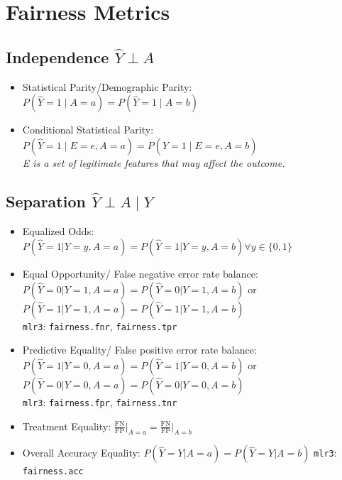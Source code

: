 \documentclass[11pt,a4paper]{article}
\begin{document}
\section{Fairness Metrics \parencite{verma2018}}

\subsection*{Independence $\hat{Y} \perp A$}
\begin{itemize}[leftmargin=2em]
    \item Statistical Parity/Demographic Parity: $P(\hat{Y} = 1 \mid A = a) = P(\hat{Y} = 1 \mid A = b)$
    \item Conditional Statistical Parity: $P(\hat{Y} = 1 \mid E = e, A = a) = P(\hat{Y} = 1 \mid E = e, A = b)$ \\ \textit{E is a set of legitimate features that may affect the outcome.}
\end{itemize}

\subsection*{Separation $\hat{Y} \perp A \mid Y$}
\begin{itemize}[leftmargin=2em]
    \item Equalized Odds: $P(\hat{Y} = 1 | Y = y, A = a) = P(\hat{Y} = 1 | Y = y, A = b) \forall y \in \{0, 1\}$
    \item Equal Opportunity/ False negative error rate balance: $P(\hat{Y} = 0 | Y = 1, A = a) = P(\hat{Y} = 0 | Y = 1, A = b)$ or $P(\hat{Y} = 1 | Y = 1, A = a) = P(\hat{Y} = 1 | Y = 1, A = b)$ \\ \texttt{mlr3}: \texttt{fairness.fnr}, \texttt{fairness.tpr}
    \item Predictive Equality/ False positive error rate balance: $P(\hat{Y} = 1 | Y = 0, A = a) = P(\hat{Y} = 1 | Y = 0, A = b)$ or $P(\hat{Y} = 0 | Y = 0, A = a) = P(\hat{Y} = 0 | Y = 0, A = b)$ \\ \texttt{mlr3}: \texttt{fairness.fpr}, \texttt{fairness.tnr}
    \item Treatment Equality: $\frac{\text{FN}}{\text{FP}} \big|_{A = a} = \frac{\text{FN}}{\text{FP}} \big|_{A = b}$
    \item Overall Accuracy Equality: $P(\hat{Y} = Y | A = a) = P(\hat{Y} = Y | A = b)$ \texttt{mlr3}: \texttt{fairness.acc}
\end{itemize}
\end{document}
